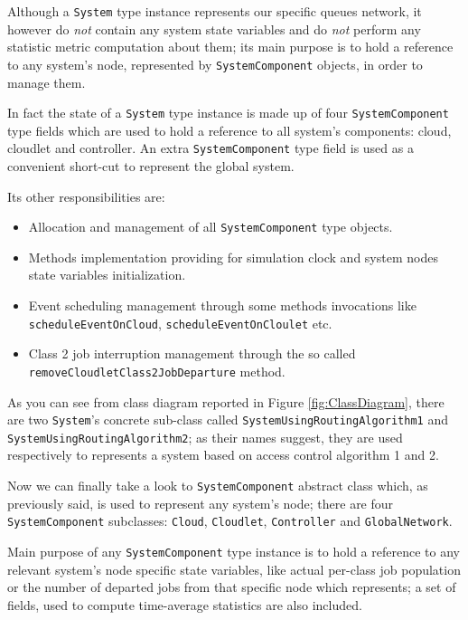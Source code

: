 \documentclass[10pt,a4paper]{article}
\begin{document}
Although a \texttt{System} type instance represents our specific queues network, it however do \textit{not} contain any system state variables and do \textit{not} perform any statistic metric computation about them; its main purpose is to hold a reference to any system's node, represented by \texttt{SystemComponent} objects, in order to manage them. 

In fact the state of a \texttt{System} type instance is made up of four \texttt{SystemComponent} type fields which are used to hold a reference to all system's components: cloud, cloudlet and controller. An extra \texttt{SystemComponent} type field is used as a convenient short-cut to represent the global system.

Its other responsibilities are:

\begin{itemize}

\item Allocation and management of all \texttt{SystemComponent} type objects.

\item Methods implementation providing for simulation clock and system nodes state variables initialization.

\item Event scheduling management through some methods invocations like \texttt{sche\-dule\-Event\-OnCloud}, \texttt{scheduleEventOnCloulet} etc.

\item Class 2 job interruption management through the so called \texttt{removeCloud\-let\-Class2JobDeparture} method.
\end{itemize}

As you can see from class diagram reported in Figure \ref{fig:ClassDiagram}, there are two \texttt{System}'s concrete sub-class called \texttt{Sys\-tem\-Using\-RoutingAlgorithm1} and \texttt{System\-UsingRoutingAlgorithm2}; as their names suggest, they are used respectively to represents a system based on access control algorithm 1 and 2. 

Now we can finally take a look to \texttt{SystemComponent} abstract class which, as previously said, is used to represent any system's node; there are four \texttt{SystemComponent} subclasses: \texttt{Cloud}, \texttt{Cloudlet}, \texttt{Controller} and \texttt{GlobalNetwork}. 

Main purpose of any \texttt{SystemComponent} type instance is to hold a reference to any relevant system's node specific state variables, like actual per-class job population or the number of departed jobs from that specific node which represents; a set of fields, used to compute time-average statistics are also included.
\end{document}

